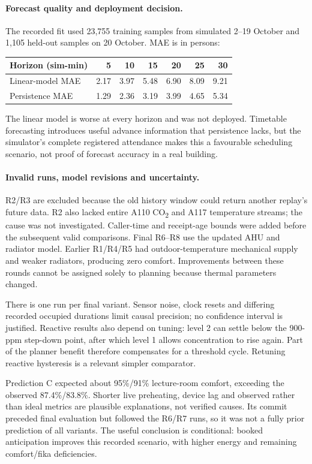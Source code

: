 \documentclass[11pt,a4paper]{article}
\begin{document}
\paragraph{Forecast quality and deployment decision.}
The recorded fit used 23,755 training samples from simulated 2--19 October and 1,105 held-out samples on 20 October. MAE is in persons:
\noindent\begin{tabularx}{\linewidth}{Xrrrrrr}\toprule Horizon (sim-min) & 5 & 10 & 15 & 20 & 25 & 30\\\midrule
Linear-model MAE & 2.17 & 3.97 & 5.48 & 6.90 & 8.09 & 9.21\\
Persistence MAE & 1.29 & 2.36 & 3.19 & 3.99 & 4.65 & 5.34\\\bottomrule\end{tabularx}
The linear model is worse at every horizon and was not deployed. Timetable forecasting introduces useful advance information that persistence lacks, but the simulator's complete registered attendance makes this a favourable scheduling scenario, not proof of forecast accuracy in a real building.

\paragraph{Invalid runs, model revisions and uncertainty.}
R2/R3 are excluded because the old history window could return another replay's future data. R2 also lacked entire A110 CO\textsubscript{2} and A117 temperature streams; the cause was not investigated. Caller-time and receipt-age bounds were added before the subsequent valid comparisons. Final R6--R8 use the updated AHU and radiator model. Earlier R1/R4/R5 had outdoor-temperature mechanical supply and weaker radiators, producing zero comfort. Improvements between these rounds cannot be assigned solely to planning because thermal parameters changed.

There is one run per final variant. Sensor noise, clock resets and differing recorded occupied durations limit causal precision; no confidence interval is justified. Reactive results also depend on tuning: level 2 can settle below the 900-ppm step-down point, after which level 1 allows concentration to rise again. Part of the planner benefit therefore compensates for a threshold cycle. Retuning reactive hysteresis is a relevant simpler comparator.

Prediction C expected about 95\%/91\% lecture-room comfort, exceeding the observed 87.4\%/83.8\%. Shorter live preheating, device lag and observed rather than ideal metrics are plausible explanations, not verified causes. Its commit preceded final evaluation but followed the R6/R7 runs, so it was not a fully prior prediction of all variants. The useful conclusion is conditional: booked anticipation improves this recorded scenario, with higher energy and remaining comfort/fika deficiencies.
\end{document}
